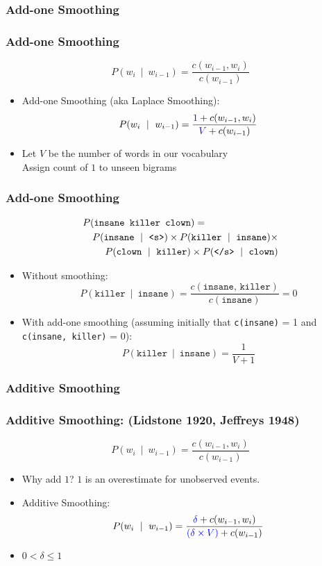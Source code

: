 \subsubsection{Add-one Smoothing}

\begin{frame}
\frametitle{Add-one Smoothing}
\[ P(w_i~\mid~w_{i-1}) = \frac{ c(w_{i-1},w_i) } { c(w_{i-1}) } \]
\begin{itemize}[<+->]
\item Add-one Smoothing (aka Laplace Smoothing):
\[ P(w_i~\mid~w_{i-1}) = \frac{ {\color{blue}{1}} + c(w_{i-1},w_i) } { {\color{blue}{V}} + c(w_{i-1}) } \]
\item Let $V$ be the number of words in our vocabulary \\
 Assign count of $1$ to unseen bigrams
\end{itemize}
\end{frame}

\begin{frame}
\frametitle{Add-one Smoothing}
\begin{eqnarray*}
\lefteqn{P(\texttt{insane killer clown})=}\\
&& P(\texttt{insane}~\mid~\texttt{<s>}) \times P(\texttt{killer}~\mid~\texttt{insane}) \times \\
&& P(\texttt{clown}~\mid~\texttt{killer}) \times P(\texttt{</s>}~\mid~\texttt{clown})
\end{eqnarray*}
\begin{itemize}[<+->]
\item Without smoothing:
\[ P(\texttt{killer}~\mid~\texttt{insane}) = \frac{ c(\texttt{insane, killer}) } { c(\texttt{insane}) }  = 0 \]
\item With add-one smoothing (assuming initially that \texttt{c(insane)} = 1 and \texttt{c(insane, killer)} = 0):
\[ P(\texttt{killer}~\mid~\texttt{insane}) = \frac{ 1 } { V + 1 }  \]
\end{itemize}
\end{frame}

\subsubsection{Additive Smoothing}

\begin{frame}
\frametitle{Additive Smoothing: (Lidstone 1920, Jeffreys 1948)} 
\[ P(w_i~\mid~w_{i-1}) = \frac{ c(w_{i-1},w_i) } { c(w_{i-1}) } \]
\begin{itemize}[<+->]
\item Why add $1$? $1$ is an overestimate for unobserved events.
\item Additive Smoothing:
\[ P(w_i~\mid~w_{i-1}) = \frac{ {\color{blue}{\delta}} + c(w_{i-1},w_i) } { {\color{blue}{(\delta \times V)}} + c(w_{i-1}) } \]
\item $0 < \delta \leq 1$
\end{itemize}
\end{frame}

